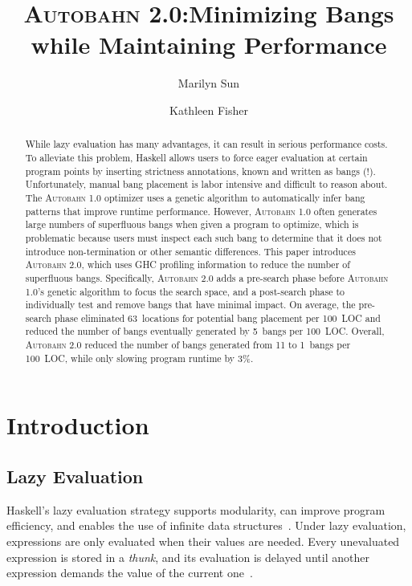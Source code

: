 \documentclass[format=sigplan, review=true]{acmart}
\newcommand{\Ao}[0]{\textsc{Autobahn 1.0}}
\newcommand{\At}[0]{\textsc{Autobahn 2.0}}
\newcommand{\preopt}[0]{pre-search}
\newcommand{\postopt}[0]{post-search}
\begin{document}
\title{\At:\break Minimizing Bangs while Maintaining Performance}
\author{Marilyn Sun}
\author{Kathleen Fisher}
\begin{abstract}

While lazy evaluation has many advantages, it can result in serious
performance costs. To alleviate this problem, Haskell allows users to
force eager evaluation at certain program points by inserting
strictness annotations, known and written as bangs (!).
Unfortunately, manual bang placement
is labor intensive and difficult to reason about. The \Ao{}
optimizer uses a genetic algorithm to automatically infer bang patterns
that improve runtime performance. However, \Ao{} often generates
large numbers of superfluous bangs when given a program to optimize,
which is problematic because users must inspect each such bang to
determine that it does not introduce non-termination or other semantic
differences. 
This paper introduces \At, which uses GHC
profiling information to reduce the number of superfluous bangs.
Specifically,
\At{} adds a \preopt{} phase before \Ao's genetic algorithm
to focus the search space, and a \postopt{} phase to
individually test and remove bangs that have minimal impact. On average, the \preopt{}
phase eliminated 63~locations for potential bang
placement per 100~LOC and reduced the number of bangs eventually
generated by 5~bangs per 100~LOC. Overall, \At{} reduced the number of
bangs generated from 11 to 1~bangs per 100~LOC, while only
slowing program runtime by 3\%. 
\end{abstract}


\maketitle

\section{Introduction}

\subsection{Lazy Evaluation}
Haskell's lazy evaluation strategy supports modularity, can improve
program efficiency, and enables the use of infinite data
structures~\cite{Hughes89}. Under lazy evaluation, expressions are
only evaluated when their values are needed. Every unevaluated
expression is stored in a \textit{thunk}, and its evaluation is
delayed until another expression demands the value of the current
one~\cite{PeytonJones89}. 
\end{document}
